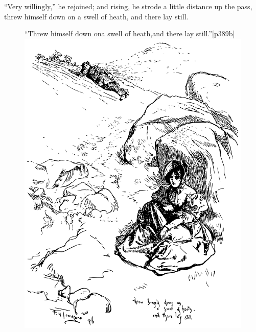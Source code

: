 \enquote{Very willingly,} he rejoined; and rising, he strode a little
distance up the pass, threw himself down on a swell of heath, and there
lay still.

\begin{figure}
	\begin{sidecaption}{\enquote{Threw himself down on\linebreak a swell of heath,\linebreak and there lay still.}}[p389b]
		\centering
		\includegraphics[width=\linewidth]{images/p389b.pdf}
	\end{sidecaption}
\end{figure}

